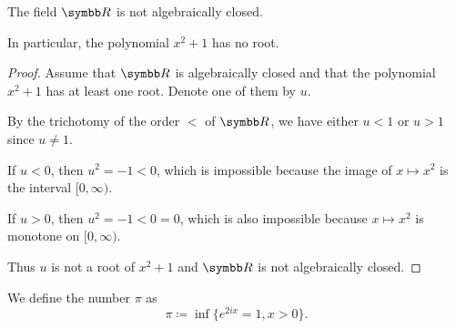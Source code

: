 \begin{proposition}\label{thm:reals_not_algebraically_closed}
  The field \( \R \) is not algebraically closed.

  In particular, the polynomial \( x^2 + 1 \) has no root.
\end{proposition}
\begin{proof}
  Assume that \( \R \) is algebraically closed and that the polynomial \( x^2 + 1 \) has at least one root. Denote one of them by \( u \).

  By the trichotomy of the order \( < \) of \( \R \), we have either \( u < 1 \) or \( u > 1 \) since \( u \neq 1 \).

  If \( u < 0 \), then \( u^2 = -1 < 0 \), which is impossible because the image of \( x \mapsto x^2 \) is the interval \( [0, \infty) \).

  If \( u > 0 \), then \( u^2 = -1 < 0 = 0 \), which is also impossible because \( x \mapsto x^2 \) is monotone on \( [0, \infty) \).

  Thus \( u \) is not a root of \( x^2 + 1 \) and \( \R \) is not algebraically closed.
\end{proof}

\begin{definition}\label{def:pi}\cite[515]{Knapp2016BAlg}
  We define the number \( \pi \) as
  \begin{equation*}
    \pi \coloneqq \inf\{ e^{2ix} = 1, x > 0 \}.
  \end{equation*}
\end{definition}
